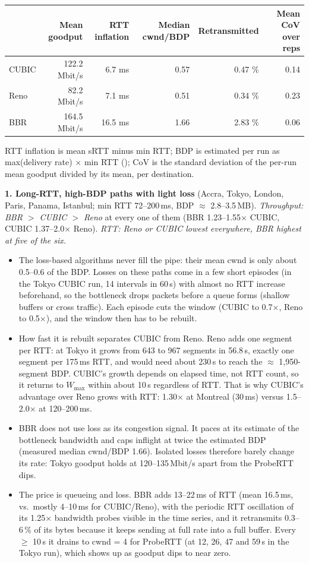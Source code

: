 \documentclass[10pt]{article}
\newcommand{\repo}{https://github.com/philwisniewski/cs-422-assignment-2}
\newcommand{\commit}{d1408ba303b1e3132ba5504e32ebf2ed3572d4e0}
\newcommand{\src}[4]{\href{\repo/blob/\commit/#1\#L#2-L#3}{\texttt{\detokenize{#4}}}}
\begin{document}
\begin{center}\small
\begin{tabular}{@{}lrrrrr@{}}
\toprule
& Mean goodput & RTT inflation & Median cwnd/BDP & Retransmitted & Mean CoV over reps \\
\midrule
CUBIC & 122.2 Mbit/s & 6.7 ms & 0.57 & 0.47 \% & 0.14 \\
Reno & 82.2 Mbit/s & 7.1 ms & 0.51 & 0.34 \% & 0.23 \\
BBR & 164.5 Mbit/s & 16.5 ms & 1.66 & 2.83 \% & 0.06 \\
\bottomrule
\end{tabular}
\end{center}
RTT inflation is mean sRTT minus min RTT; BDP is estimated per run as max(delivery rate) $\times$ min RTT (\src{analysis.py}{166}{201}{run_stats}); CoV is the standard deviation of the per-run mean goodput divided by its mean, per destination.

\textbf{1. Long-RTT, high-BDP paths with light loss} (Accra, Tokyo, London, Paris, Panama, Istanbul; min RTT 72--200\,ms, BDP $\approx$ 2.8--3.5\,MB). \emph{Throughput: BBR $>$ CUBIC $>$ Reno} at every one of them (BBR 1.23--1.55$\times$ CUBIC, CUBIC 1.37--2.0$\times$ Reno). \emph{RTT: Reno or CUBIC lowest everywhere, BBR highest at five of the six.}
\begin{itemize}
\item The loss-based algorithms never fill the pipe: their mean cwnd is only about 0.5--0.6 of the BDP. Losses on these paths come in a few short episodes (in the Tokyo CUBIC run, 14 intervals in 60\,s) with almost no RTT increase beforehand, so the bottleneck drops packets before a queue forms (shallow buffers or cross traffic). Each episode cuts the window (CUBIC to 0.7$\times$, Reno to 0.5$\times$), and the window then has to be rebuilt.
\item How fast it is rebuilt separates CUBIC from Reno. Reno adds one segment per RTT: at Tokyo it grows from 643 to 967 segments in 56.8\,s, exactly one segment per 175\,ms RTT, and would need about 230\,s to reach the $\approx$ 1,950-segment BDP. CUBIC's growth depends on elapsed time, not RTT count, so it returns to $W_{\max}$ within about 10\,s regardless of RTT. That is why CUBIC's advantage over Reno grows with RTT: 1.30$\times$ at Montreal (30\,ms) versus 1.5--2.0$\times$ at 120--200\,ms.
\item BBR does not use loss as its congestion signal. It paces at its estimate of the bottleneck bandwidth and caps inflight at twice the estimated BDP (measured median cwnd/BDP 1.66). Isolated losses therefore barely change its rate: Tokyo goodput holds at 120--135\,Mbit/s apart from the ProbeRTT dips.
\item The price is queueing and loss. BBR adds 13--22\,ms of RTT (mean 16.5\,ms, vs.\ mostly 4--10\,ms for CUBIC/Reno), with the periodic RTT oscillation of its 1.25$\times$ bandwidth probes visible in the time series, and it retransmits 0.3--6\,\% of its bytes because it keeps sending at full rate into a full buffer. Every $\geq$ 10\,s it drains to cwnd = 4 for ProbeRTT (at 12, 26, 47 and 59\,s in the Tokyo run), which shows up as goodput dips to near zero.
\end{itemize}
\end{document}
